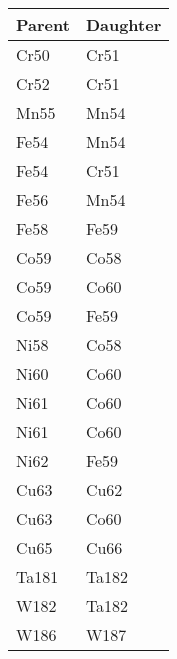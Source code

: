 \documentclass[letterpaper,10pt,english]{sphinxmanual}
\begin{document}
\begin{savenotes}\sphinxattablestart
\centering
{}
\sphinxthecaptionisattop
{}\label{\detokenize{usage/benchmarks:id30}}
\sphinxaftertopcaption
\begin{tabulary}{\linewidth}[t]{|T|T|}
\hline
\sphinxstyletheadfamily 
Parent
&\sphinxstyletheadfamily 
Daughter
\\
\hline
Cr50
&
Cr51
\\
\hline
Cr52
&
Cr51
\\
\hline
Mn55
&
Mn54
\\
\hline
Fe54
&
Mn54
\\
\hline
Fe54
&
Cr51
\\
\hline
Fe56
&
Mn54
\\
\hline
Fe58
&
Fe59
\\
\hline
Co59
&
Co58
\\
\hline
Co59
&
Co60
\\
\hline
Co59
&
Fe59
\\
\hline
Ni58
&
Co58
\\
\hline
Ni60
&
Co60
\\
\hline
Ni61
&
Co60
\\
\hline
Ni61
&
Co60
\\
\hline
Ni62
&
Fe59
\\
\hline
Cu63
&
Cu62
\\
\hline
Cu63
&
Co60
\\
\hline
Cu65
&
Cu66
\\
\hline
Ta181
&
Ta182
\\
\hline
W182
&
Ta182
\\
\hline
W186
&
W187
\\
\hline
\end{tabulary}
\par
\sphinxattableend\end{savenotes}
\end{document}
